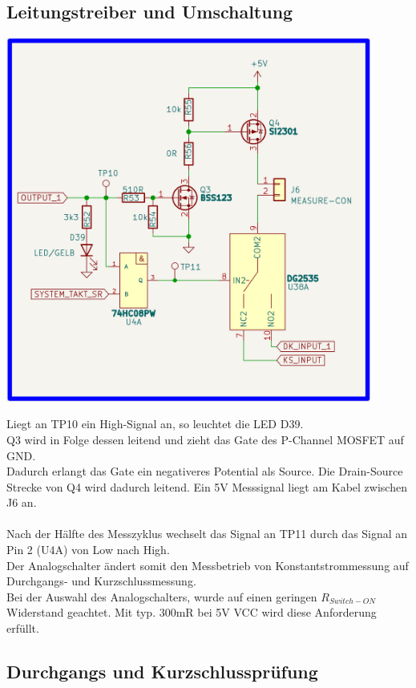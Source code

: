 \newpage
\subsection{Leitungstreiber und Umschaltung}

\begin{center}
\includegraphics[width=12cm]{Bilder/Leitungstreiber.png}
\end{center}

Liegt an TP10 ein High-Signal an, so leuchtet die LED D39.
\\
Q3 wird in Folge dessen leitend und zieht das Gate des P-Channel MOSFET auf GND. 
\\
Dadurch erlangt das Gate ein negativeres Potential als Source. Die Drain-Source Strecke von Q4 wird dadurch leitend. Ein 5V Messsignal liegt am Kabel zwischen J6 an. 
\\
\\
Nach der Hälfte des Messzyklus wechselt das Signal an TP11 durch das Signal an Pin 2 (U4A) von Low nach High. 
\\
Der Analogschalter ändert somit den Messbetrieb von Konstantstrommessung auf Durchgangs- und Kurzschlussmessung.
\\
Bei der Auswahl des Analogschalters, wurde auf einen geringen $R_{Switch-ON}$ Widerstand geachtet. Mit typ. 300mR bei 5V VCC wird diese Anforderung erfüllt. 

\newpage
\subsection{Durchgangs und Kurzschlussprüfung}

